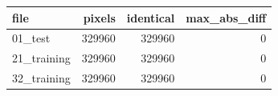\begin{tabular}{lrrr}
\toprule
file & pixels & identical & max_abs_diff \\
\midrule
01_test & 329960 & 329960 & 0 \\
21_training & 329960 & 329960 & 0 \\
32_training & 329960 & 329960 & 0 \\
\bottomrule
\end{tabular}
